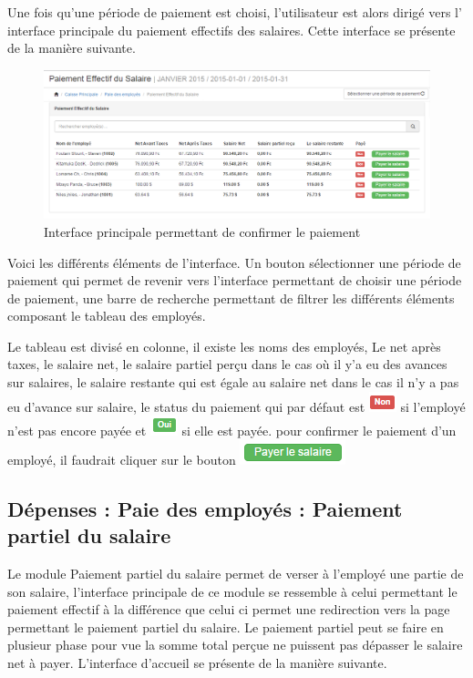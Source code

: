 \documentclass[12pt,a4paper]{report}
\begin{document}
Une fois qu'une période de paiement est choisi, l'utilisateur est alors dirigé vers l' interface principale du paiement effectifs des salaires. Cette interface se présente de la manière suivante.

\begin{figure}[h]
\begin{center}
\includegraphics[width=14cm]{pic/paiementSalaire.png}
\end{center}
\caption{Interface principale permettant de confirmer le paiement}
\label{Interface principale permettant de confirmer le paiement}
\end{figure}


Voici les différents éléments de l'interface. Un bouton sélectionner une période de paiement qui permet de revenir vers l'interface permettant de choisir une période de paiement, une barre de recherche permettant de filtrer les différents éléments composant le tableau des employés.

Le tableau est divisé en colonne, il existe les noms des employés, Le net après taxes, le salaire net, le salaire partiel perçu dans le cas où il y'a eu des avances sur salaires, le salaire restante qui est égale au salaire net dans le cas il n'y a pas eu d'avance sur salaire, le status du paiement qui par défaut est \includegraphics[scale=0.7]{pic/NonTaxes.png} si l'employé n'est pas encore payée et \includegraphics[scale=0.7]{pic/OuiTaxes.png} si elle est payée. pour confirmer le paiement d'un employé, il faudrait cliquer sur le bouton \includegraphics[scale=0.7]{pic/PayeSalary.png}

\subsection{Dépenses : Paie des employés : Paiement partiel du salaire}
Le module Paiement partiel du salaire permet de verser à l'employé une partie de son salaire, l'interface principale de ce module se ressemble à celui permettant le paiement effectif à la différence que celui ci permet une redirection vers la page permettant le paiement partiel du salaire.
Le paiement partiel peut se faire en plusieur phase pour vue la somme total perçue ne puissent pas dépasser le salaire net à payer. L'interface d'accueil se présente de la manière suivante.
\end{document}
